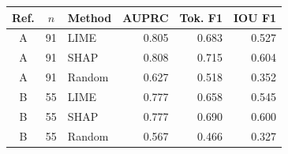 \begin{tabular}{cclrrr}
\toprule
Ref. & $n$ & Method & AUPRC & Tok. F1 & IOU F1 \\
\midrule
A & 91 & LIME & 0.805 & 0.683 & 0.527 \\
A & 91 & SHAP & 0.808 & 0.715 & 0.604 \\
A & 91 & Random & 0.627 & 0.518 & 0.352 \\
\midrule
B & 55 & LIME & 0.777 & 0.658 & 0.545 \\
B & 55 & SHAP & 0.777 & 0.690 & 0.600 \\
B & 55 & Random & 0.567 & 0.466 & 0.327 \\
\bottomrule
\end{tabular}
